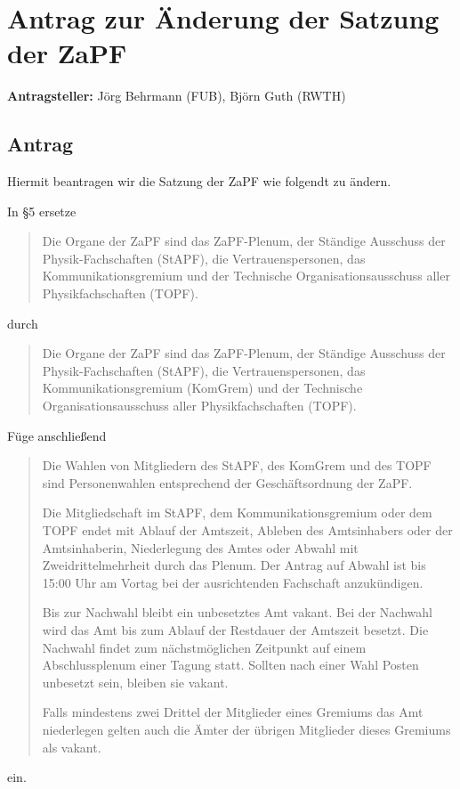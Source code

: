 \documentclass[draft,10pt,oneside]{scrartcl}
\begin{document}
\section*{Antrag zur Änderung der Satzung der ZaPF}

\textbf{Antragsteller:} Jörg Behrmann (FUB), Björn Guth (RWTH)

\subsection*{Antrag}

Hiermit beantragen wir die Satzung der ZaPF wie folgendt zu ändern.

In §5 ersetze
\begin{quote}
	Die Organe der ZaPF sind das ZaPF-Plenum, der Ständige Ausschuss der
	Physik-Fachschaften (StAPF), die Vertrauenspersonen, das Kommunikationsgremium
	und der Technische Organisationsausschuss aller Physikfachschaften (TOPF).
\end{quote}
durch
\begin{quote}
	Die Organe der ZaPF sind das ZaPF-Plenum, der Ständige Ausschuss der
	Physik-Fachschaften (StAPF), die Vertrauenspersonen, das Kommunikationsgremium
	(KomGrem) und der Technische Organisationsausschuss aller Physikfachschaften
	(TOPF).
\end{quote}

Füge anschließend
\begin{quote}
	Die Wahlen von Mitgliedern des StAPF, des KomGrem und des TOPF sind
	Personenwahlen entsprechend der Geschäftsordnung der ZaPF.

	Die Mitgliedschaft im StAPF, dem Kommunikationsgremium oder dem TOPF endet mit
	Ablauf der Amtszeit, Ableben des Amtsinhabers oder der Amtsinhaberin,
	Niederlegung des Amtes oder Abwahl mit Zweidrittelmehrheit durch das Plenum. Der
	Antrag auf Abwahl ist bis 15:00 Uhr am Vortag bei der ausrichtenden Fachschaft
	anzukündigen.

	Bis zur Nachwahl bleibt ein unbesetztes Amt vakant. Bei der Nachwahl wird das
	Amt bis zum Ablauf der Restdauer der Amtszeit besetzt.
	Die Nachwahl findet zum nächstmöglichen Zeitpunkt auf einem Abschlussplenum
	einer Tagung statt.
	Sollten nach einer Wahl Posten unbesetzt sein, bleiben sie vakant.

	Falls mindestens zwei Drittel der Mitglieder eines Gremiums das Amt niederlegen
	gelten auch die Ämter der übrigen Mitglieder dieses Gremiums als vakant.
\end{quote}
ein.
\vspace{0.25cm}
\end{document}
